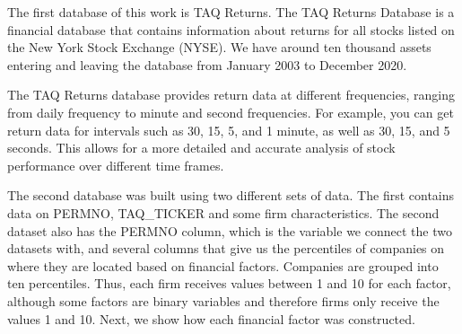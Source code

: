 The first database of this work is TAQ Returns. The TAQ Returns Database is a financial database that contains information about returns for all stocks listed on the New York Stock Exchange (NYSE). We have around ten thousand assets entering and leaving the database from January 2003 to December 2020.

The TAQ Returns database provides return data at different frequencies, ranging from daily frequency to minute and second frequencies. For example, you can get return data for intervals such as 30, 15, 5, and 1 minute, as well as 30, 15, and 5 seconds. This allows for a more detailed and accurate analysis of stock performance over different time frames.

The second database was built using two different sets of data. The first contains data on PERMNO, TAQ\_TICKER and some firm characteristics. The second dataset also has the PERMNO column, which is the variable we connect the two datasets with, and several columns that give us the percentiles of companies on where they are located based on financial factors. Companies are grouped into ten percentiles. Thus, each firm receives values between 1 and 10 for each factor, although some factors are binary variables and therefore firms only receive the values 1 and 10. Next, we show how each financial factor was constructed.



